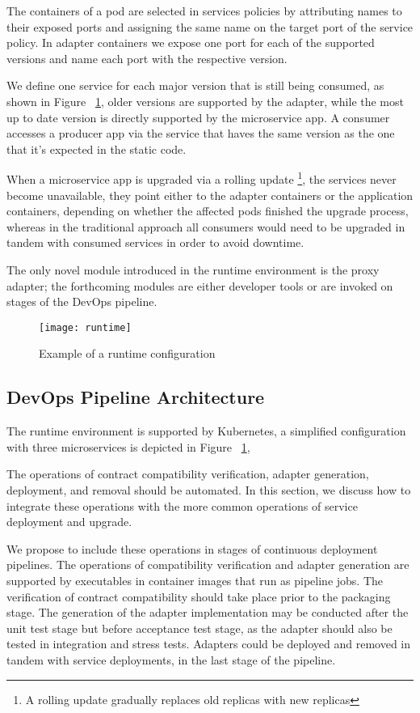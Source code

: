 The containers of a pod are selected in services policies by attributing names to their exposed ports and assigning the same name on the target port of the service policy.
In adapter containers we expose one port for each of the supported versions and name each port with the respective version.

We define one service for each major version that is still being consumed, as shown in Figure ~\ref{fig:runtime},
older versions are supported by the adapter, while the most up to date version is directly supported by the microservice app.
A consumer accesses a producer app via the service that haves the same version as the one that it's expected in the static code.

When a microservice app is upgraded via a rolling update \footnote{A rolling update gradually replaces old replicas with new replicas},
the services never become unavailable, they point either to the adapter containers or the application containers, depending on whether the affected pods finished the upgrade process,
whereas in the traditional approach all consumers would need to be upgraded in tandem with consumed services in order to avoid downtime.

The only novel module introduced in the runtime environment is the proxy adapter;
the forthcoming modules are either developer tools or are invoked on stages of the DevOps pipeline.

\begin{figure}[htbp]
    \centering
    \texttt{[image: runtime]}
    \caption{Example of a runtime configuration}
    \label{fig:runtime}
\end{figure}

\subsection{DevOps Pipeline Architecture} %
\label{sec:devops_pipeline_architecture}

The runtime environment is supported by Kubernetes,
a simplified configuration with three microservices is depicted in Figure ~\ref{fig:runtime},

The operations of contract compatibility verification, adapter generation, deployment, and removal should be automated.
In this section, we discuss how to integrate these operations with the more common operations of service deployment and upgrade.

We propose to include these operations in stages of continuous deployment pipelines.
The operations of compatibility verification and adapter generation are supported by executables in container images that run as pipeline jobs.
The verification of contract compatibility should take place prior to the packaging stage.
The generation of the adapter implementation may be conducted after the unit test stage but before acceptance test stage,
as the adapter should also be tested in integration and stress tests.
Adapters could be deployed and removed in tandem with service deployments, in the last stage of the pipeline.

